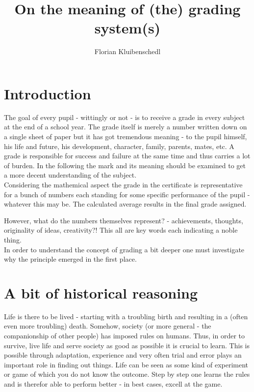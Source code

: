 \documentclass[12pt,a4paper]{article}
\author{Florian Kluibenschedl}
\title{On the meaning of (the) grading system(s)}
\begin{document}
  \maketitle
  
  \section{Introduction}
  The goal of every pupil - wittingly or not - is to receive a grade in every subject at the end of a school year. The grade itself is merely a number written down on a single sheet of paper but it has got tremendous meaning - to the pupil himself, his life and future, his development, character, family, parents, mates, etc.  A grade is responsible for success and failure at the same time and thus carries a lot of burden. In the following the mark and its meaning should be examined to get a more decent understanding of the subject. \\
  
  Considering the mathemical aspect the grade in the certificate is representative for a bunch of numbers each standing for some specific performance of the pupil - whatever this may be. The calculated average results in the final grade assigned.
  
  However, what do the numbers themselves represent? - achievements, thoughts, originality of ideas, creativity?! This all are key words each indicating a noble thing. \\
  
  In order to understand the concept of grading a bit deeper one must investigate why the principle emerged in the first place.\\
  
  \section{A bit of historical reasoning}
  Life is there to be lived - starting with a troubling birth and resulting in a (often even more troubling) death. Somehow, society (or more general - the companionship of other people) has imposed rules on humans. Thus, in order to survive, live life and serve society as good as possible it is crucial to learn. This is possible through adaptation, experience and very often trial and error plays an important role in finding out things. Life can be seen as some kind of experiment or game of which you do not know the outcome. Step by step one learns the rules and is therefor able to perform better - in best cases, excell at the game. 
  
\end{document}
